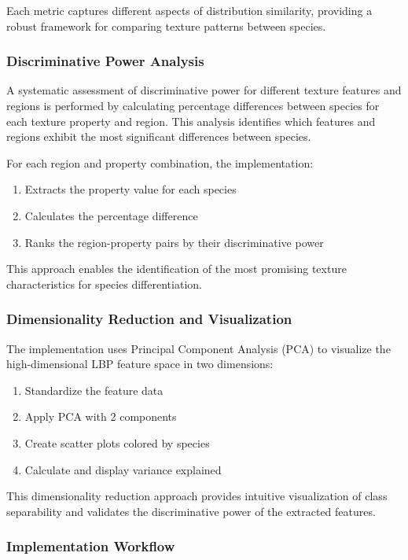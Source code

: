 \documentclass[a4paper,12pt]{report}
\begin{document}
Each metric captures different aspects of distribution similarity, providing a robust framework for comparing texture patterns between species.

\subsubsection{Discriminative Power Analysis}

A systematic assessment of discriminative power for different texture features and regions is performed by calculating percentage differences between species for each texture property and region. This analysis identifies which features and regions exhibit the most significant differences between species.

For each region and property combination, the implementation:
\begin{enumerate}
    \item Extracts the property value for each species
    \item Calculates the percentage difference
    \item Ranks the region-property pairs by their discriminative power
\end{enumerate}

This approach enables the identification of the most promising texture characteristics for species differentiation.

\subsubsection{Dimensionality Reduction and Visualization}

The implementation uses Principal Component Analysis (PCA) to visualize the high-dimensional LBP feature space in two dimensions:

\begin{enumerate}
    \item Standardize the feature data
    \item Apply PCA with 2 components
    \item Create scatter plots colored by species
    \item Calculate and display variance explained
\end{enumerate}

This dimensionality reduction approach provides intuitive visualization of class separability and validates the discriminative power of the extracted features.

\subsubsection{Implementation Workflow}
\end{document}
